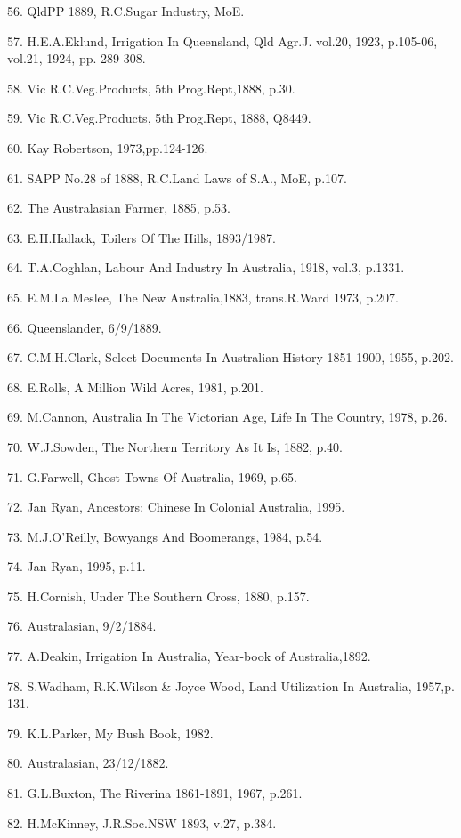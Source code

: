 56. QldPP 1889, R.C.Sugar Industry, MoE.

57. H.E.A.Eklund, Irrigation In Queensland, Qld Agr.J. vol.20, 1923,
      p.105-06, vol.21, 1924, pp. 289-308.

58. Vic R.C.Veg.Products, 5th Prog.Rept,1888, p.30.

59. Vic R.C.Veg.Products, 5th Prog.Rept, 1888, Q8449.

60. Kay Robertson, 1973,pp.124-126.

61. SAPP No.28 of 1888, R.C.Land Laws of S.A., MoE, p.107.

62. The Australasian Farmer, 1885, p.53.

63. E.H.Hallack, Toilers Of The Hills, 1893/1987.

64. T.A.Coghlan, Labour And Industry In Australia, 1918, vol.3, p.1331.

65. E.M.La Meslee, The New Australia,1883,  trans.R.Ward 1973, p.207.

66. Queenslander, 6/9/1889.

67. C.M.H.Clark, Select Documents In Australian History 1851-1900,
       1955, p.202.

68. E.Rolls, A Million Wild Acres, 1981, p.201.

69. M.Cannon, Australia In The Victorian Age, Life In The Country, 1978,
       p.26.

70. W.J.Sowden, The Northern Territory As It Is, 1882, p.40.

71. G.Farwell, Ghost Towns Of Australia, 1969, p.65.

72. Jan Ryan, Ancestors: Chinese In Colonial Australia, 1995.

73. M.J.O'Reilly, Bowyangs And Boomerangs, 1984, p.54.

74. Jan Ryan, 1995, p.11.

75. H.Cornish, Under The Southern Cross, 1880, p.157.

76. Australasian, 9/2/1884.

77. A.Deakin, Irrigation In Australia, Year-book of Australia,1892.

78. S.Wadham, R.K.Wilson \& Joyce Wood, Land Utilization In
      Australia, 1957,p. 131.

79. K.L.Parker, My Bush Book, 1982.

80. Australasian, 23/12/1882.

81. G.L.Buxton, The Riverina 1861-1891, 1967, p.261.

82. H.McKinney, J.R.Soc.NSW 1893, v.27, p.384.

